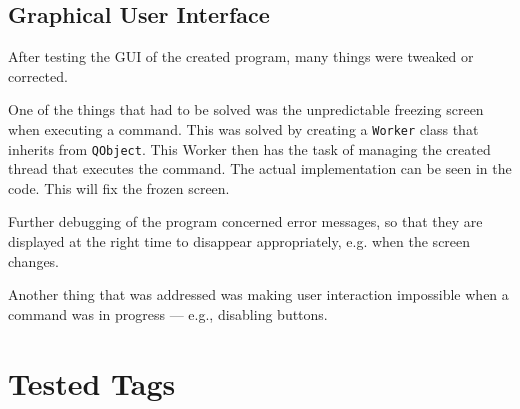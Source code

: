\subsection{Graphical User Interface}
After testing the GUI of the created program, many things were tweaked or corrected.

One of the things that had to be solved was the unpredictable freezing screen when executing a command. This was solved by creating a \texttt{Worker} class that inherits from \texttt{QObject}. This Worker then has the task of managing the created thread that executes the command. The actual implementation can be seen in the code. This will fix the frozen screen.

Further debugging of the program concerned error messages, so that they are displayed at the right time to disappear appropriately, e.g. when the screen changes.

Another thing that was addressed was making user interaction impossible when a command was in progress --- e.g., disabling buttons.


\section{Tested Tags}
\label{sec:testedtags}

